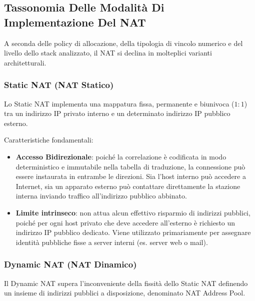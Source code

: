 \documentclass[11pt, a4paper]{article}
\begin{document}
\subsection{Tassonomia Delle Modalità Di Implementazione Del NAT}
A seconda delle policy di allocazione, della tipologia di vincolo numerico e del livello dello stack analizzato, il NAT si declina in molteplici varianti architetturali.

\subsubsection{Static NAT (NAT Statico)}
Lo Static NAT implementa una mappatura fissa, permanente e biunivoca ($1:1$) tra un indirizzo IP privato interno e un determinato indirizzo IP pubblico esterno.


Caratteristiche fondamentali:
\begin{itemize}
    \item \textbf{Accesso Bidirezionale}: poiché la correlazione è codificata in modo deterministico e immutabile nella tabella di traduzione, la connessione può essere instaurata in entrambe le direzioni. Sia l'host interno può accedere a Internet, sia un apparato esterno può contattare direttamente la stazione interna inviando traffico all'indirizzo pubblico abbinato.
    \item \textbf{Limite intrinseco}: non attua alcun effettivo risparmio di indirizzi pubblici, poiché per ogni host privato che deve accedere all'esterno è richiesto un indirizzo IP pubblico dedicato. Viene utilizzato primariamente per assegnare identità pubbliche fisse a server interni (es. server web o mail).
\end{itemize}

\subsubsection{Dynamic NAT (NAT Dinamico)}
Il Dynamic NAT supera l'inconveniente della fissità dello Static NAT definendo un insieme di indirizzi pubblici a disposizione, denominato NAT Address Pool.

\end{document}
